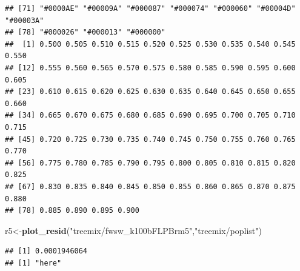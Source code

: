 \documentclass[]{article}
\newenvironment{Shaded}{\begin{snugshade}}{\end{snugshade}}
\newcommand{\KeywordTok}[1]{\textcolor[rgb]{0.13,0.29,0.53}{\textbf{#1}}}
\newcommand{\StringTok}[1]{\textcolor[rgb]{0.31,0.60,0.02}{#1}}
\newcommand{\NormalTok}[1]{#1}
\begin{document}
\begin{verbatim}
## [71] "#0000AE" "#00009A" "#000087" "#000074" "#000060" "#00004D" "#00003A"
## [78] "#000026" "#000013" "#000000"
##  [1] 0.500 0.505 0.510 0.515 0.520 0.525 0.530 0.535 0.540 0.545 0.550
## [12] 0.555 0.560 0.565 0.570 0.575 0.580 0.585 0.590 0.595 0.600 0.605
## [23] 0.610 0.615 0.620 0.625 0.630 0.635 0.640 0.645 0.650 0.655 0.660
## [34] 0.665 0.670 0.675 0.680 0.685 0.690 0.695 0.700 0.705 0.710 0.715
## [45] 0.720 0.725 0.730 0.735 0.740 0.745 0.750 0.755 0.760 0.765 0.770
## [56] 0.775 0.780 0.785 0.790 0.795 0.800 0.805 0.810 0.815 0.820 0.825
## [67] 0.830 0.835 0.840 0.845 0.850 0.855 0.860 0.865 0.870 0.875 0.880
## [78] 0.885 0.890 0.895 0.900
\end{verbatim}

\begin{Shaded}
\begin{Highlighting}[]
\NormalTok{r5<-}\KeywordTok{plot_resid}\NormalTok{(}\StringTok{"treemix/fwsw_k100bFLPBrm5"}\NormalTok{,}\StringTok{"treemix/poplist"}\NormalTok{)}
\end{Highlighting}
\end{Shaded}

\begin{verbatim}
## [1] 0.0001946064
## [1] "here"
\end{verbatim}
\end{document}
